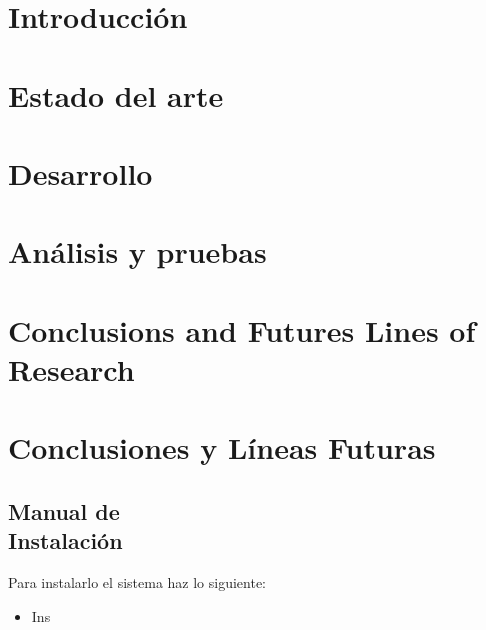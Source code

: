 \documentclass[12pt, a4paper, twoside]{article}
\begin{document}


\clearpage
\setcounter{page}{1}



\newpage



\newpage



\tableofcontents

\section{Introducción}


\section{Estado del arte}


\section{Desarrollo}


\section{Análisis y pruebas}

\section{Conclusions and Futures Lines of Research}


\section{Conclusiones y Líneas Futuras}


\printbibliography
\newpage

\begin{umaappendices}
  \section{Manual de \\ Instalación}
  Para instalarlo el sistema haz lo siguiente:
  \begin{itemize}
    \item Ins
  \end{itemize}

\end{umaappendices}


\end{document}
